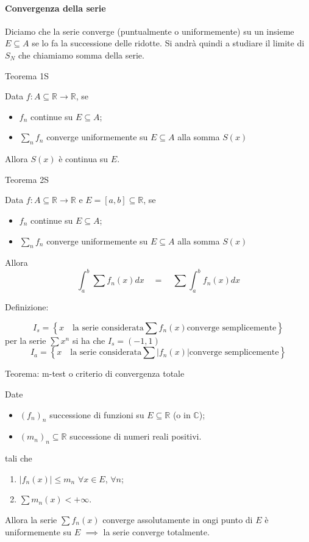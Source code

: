 \documentclass[x11names]{article}
\newcommand{\definizione}[2]{
	\begin{center}
		\fboxsep11pt
		\colorbox{myblue}{\begin{minipage}{5.75in}
				\begin{blues}{Definizione: #1}
					#2
				\end{blues}
		\end{minipage}}
	\end{center}
}
\newcommand{\teorema}[2]{
	\begin{center}
		\fboxsep11pt
		\colorbox{myred}{\begin{minipage}{5.75in}
				\begin{redes}{#1}
					#2
				\end{redes}
		\end{minipage}}
	\end{center}
}
\begin{document}
\paragraph*{Convergenza della serie} Diciamo che la serie converge (puntualmente o uniformemente) su un insieme \(E\subseteq A\) se lo fa la successione delle ridotte. Si andrà quindi a studiare il limite di \(S_{N}\) che chiamiamo somma della serie.

\teorema{Teorema 1S}{
Data \(f:A\subseteq \mathbb{R} \to \mathbb{R}\), se
\begin{itemize}
	\item \(f_{n}\) continue su \(E\subseteq A\);
	\item \(\sum_n f_{n}\) converge uniformemente su \(E\subseteq A\) alla somma \(S(x)\)
\end{itemize}
Allora \(S(x)\) è continua su \(E\).}
\teorema{Teorema 2S}{
Data \(f:A\subseteq \mathbb{R} \to \mathbb{R}\) e \(E = [a,b]\subseteq \mathbb{R}\), se
\begin{itemize}
\item \(f_{n}\) continue su \(E\subseteq A\);
\item \(\sum_n f_{n}\) converge uniformemente su \(E\subseteq A\) alla somma \(S(x)\)
\end{itemize}
Allora
\[ 
\int_{a}^{b} \sum f_{n}(x)dx \quad  = \quad \sum \int_{a}^{b}  f_{n}(x)dx 
\]}

\definizione{}{
	\[ 
	I_{s} = \left\{x \;\:\;\ \text{la serie considerata} \sum f_{n}(x) \text{converge semplicemente} \right\}
	\]
	per la serie \(\sum x^n\) si ha che \(I_{s} = (-1,1)\)
	\[ 
	I_{a} = \left\{x \;\:\;\ \text{la serie considerata} \sum |f_{n}(x)| \text{converge semplicemente} \right\}
	\]
}

\teorema{Teorema: m-test o criterio di convergenza totale}{
Date 
\begin{itemize}
	\item \((f_{n})_{n}\) successione di funzioni su \(E\subseteq \mathbb{R}\) (o in \(\mathbb{C}\));
	\item \((m_{n})_{n} \subseteq \mathbb{R}\) successione di numeri reali positivi. 
\end{itemize}
tali che
\begin{enumerate}[start=1,label={(\itshape H\arabic*)}]
	\item \(|f_{n}(x)|\leq m_{n}\) \(\forall x \in E\), \(\forall n\);
	\item \(\sum m_{n}(x) < + \infty\).
\end{enumerate}
Allora la serie \(\sum f_{n}(x)\) converge assolutamente in ongi punto di \(E\) è uniformemente su \(E\) \(\implies\) la serie converge totalmente.}
\end{document}
